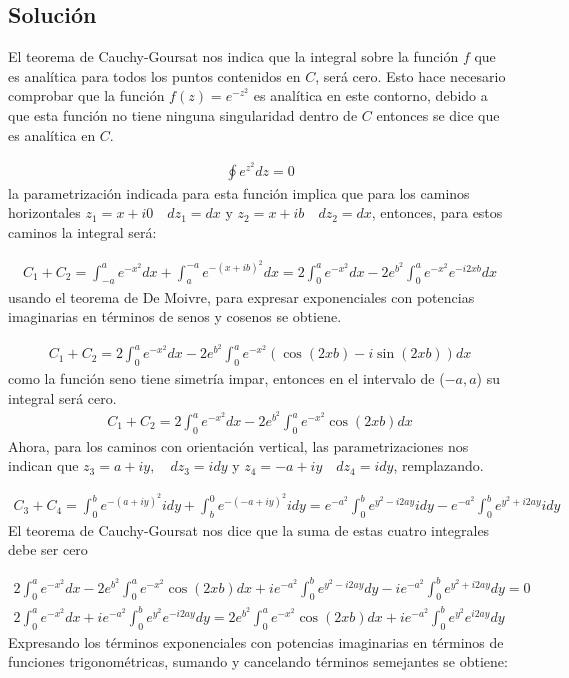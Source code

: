 \subsection*{Solución}
El teorema de Cauchy-Goursat nos indica que la integral sobre la función $f$ que es analítica para todos los puntos contenidos en $C$, será cero. Esto hace necesario comprobar que la función $f(z) = e^{-z^{2}}$ es analítica en este contorno, debido a que esta función no tiene ninguna singularidad dentro de $C$ entonces se dice que es analítica en $C$. 

\begin{gather}
    \oint e^{z^{2}}dz = 0
\end{gather}
la parametrización indicada para esta función implica que para los caminos horizontales $z_1 = x + i0 \quad dz_1 = dx$ y $z_2 = x + ib \quad dz_2 = dx$, entonces, para estos caminos la integral será:

\begin{gather*}
    C_1 + C_2 = \int_{-a}^{a}e^{-x^2}dx + \int_{a}^{-a}e^{-(x + ib)^2}dx = 2\int_{0}^{a}e^{-x^2}dx - 2e^{b^2}\int_{0}^{a}e^{-x^2}e^{- i2xb}dx
\end{gather*}
usando el teorema de De Moivre, para expresar exponenciales con potencias imaginarias en términos de senos y cosenos se obtiene.

\begin{gather*}
    C_1 + C_2 = 2\int_{0}^{a}e^{-x^2}dx - 2e^{b^2}\int_{0}^{a}e^{-x^2}\left(\cos(2xb) - i\sin(2xb)\right)dx
\end{gather*}
como la función seno tiene simetría impar, entonces en el intervalo de ($-a,a$) su integral será cero. 
\begin{gather}
    C_1 + C_2 = 2\int_{0}^{a}e^{-x^2}dx - 2e^{b^2}\int_{0}^{a}e^{-x^2}\cos(2xb)dx
\end{gather}
Ahora, para los caminos con orientación vertical, las parametrizaciones nos indican que $z_3 = a + iy, \quad dz_3 = idy$ y $z_4 = -a + iy \quad dz_4 = idy$, remplazando.

\begin{gather}
    C_3 + C_4 = \int_{0}^{b}e^{-(a + iy)^2}idy + \int_{b}^{0}e^{-(-a + iy)^2}idy = e^{-a^2}\int_{0}^{b}e^{y^2 - i2ay}idy - e^{-a^2}\int_{0}^{b}e^{y^2 + i2ay}idy
\end{gather}
El teorema de Cauchy-Goursat nos dice que la suma de estas cuatro integrales debe ser cero

\begin{gather*}
    2\int_{0}^{a}e^{-x^2}dx - 2e^{b^2}\int_{0}^{a}e^{-x^2}\cos(2xb)dx +ie^{-a^2}\int_{0}^{b}e^{y^2 - i2ay}dy - ie^{-a^2}\int_{0}^{b}e^{y^2 + i2ay}dy = 0\\ 
    2\int_{0}^{a}e^{-x^2}dx +ie^{-a^2}\int_{0}^{b}e^{y^2}e^{-i2ay}dy =  2e^{b^2}\int_{0}^{a}e^{-x^2}\cos(2xb)dx  + ie^{-a^2}\int_{0}^{b}e^{y^2}e^{i2ay}dy
\end{gather*}
Expresando los términos exponenciales con potencias imaginarias en términos de funciones trigonométricas, sumando y cancelando términos semejantes se obtiene:

